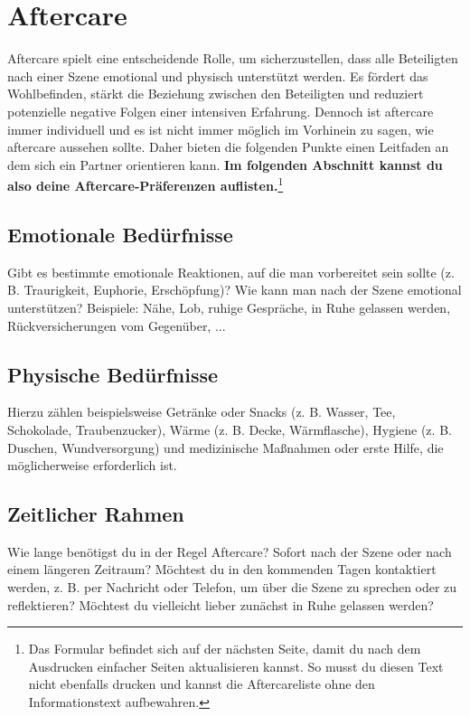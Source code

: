 \documentclass[a4paper,12pt]{article}
\begin{document}

\newpage
\section{Aftercare}
Aftercare spielt eine entscheidende Rolle, um sicherzustellen, dass alle Beteiligten nach einer Szene emotional und physisch unterstützt werden. Es fördert das Wohlbefinden, stärkt die Beziehung zwischen den Beteiligten und reduziert potenzielle negative Folgen einer intensiven Erfahrung. Dennoch ist aftercare immer individuell und es ist nicht immer möglich im Vorhinein zu sagen, wie aftercare aussehen sollte. Daher bieten die folgenden Punkte einen Leitfaden an dem sich ein Partner orientieren kann.
\textbf{Im folgenden Abschnitt kannst du also deine Aftercare-Präferenzen auflisten.}\footnote{Das Formular befindet sich auf der nächsten Seite, damit du nach dem Ausdrucken einfacher Seiten aktualisieren kannst. So musst du diesen Text nicht ebenfalls drucken und kannst die Aftercareliste ohne den Informationstext aufbewahren.}
\newpage

\subsection{Emotionale Bedürfnisse}
\noindent Gibt es bestimmte emotionale Reaktionen, auf die man vorbereitet sein sollte (z. B. Traurigkeit, Euphorie, Erschöpfung)? Wie kann man nach der Szene emotional unterstützen? Beispiele: Nähe, Lob, ruhige Gespräche, in Ruhe gelassen werden, Rückversicherungen vom Gegenüber, ... \newline
\noindent \TextField[name=AftercareEmotional,multiline=true,height=7em, width=37em]{}

\subsection{Physische Bedürfnisse}
\noindent Hierzu zählen beispielsweise Getränke oder Snacks (z. B. Wasser, Tee, Schokolade, Traubenzucker), Wärme (z. B. Decke, Wärmflasche), Hygiene (z. B. Duschen, Wundversorgung) und medizinische Maßnahmen oder erste Hilfe, die möglicherweise erforderlich ist. \newline
\noindent \TextField[name=AftercarePhysisch,multiline=true,height=7em, width=37em]{}

\subsection{Zeitlicher Rahmen}
\noindent Wie lange benötigst du in der Regel Aftercare? Sofort nach der Szene oder nach einem längeren Zeitraum? Möchtest du in den kommenden Tagen kontaktiert werden, z. B. per Nachricht oder Telefon, um über die Szene zu sprechen oder zu reflektieren? Möchtest du vielleicht lieber zunächst in Ruhe gelassen werden? \newline
\noindent \TextField[name=AftercareZeitlich,multiline=true,height=7em, width=37em]{}
\end{document}
